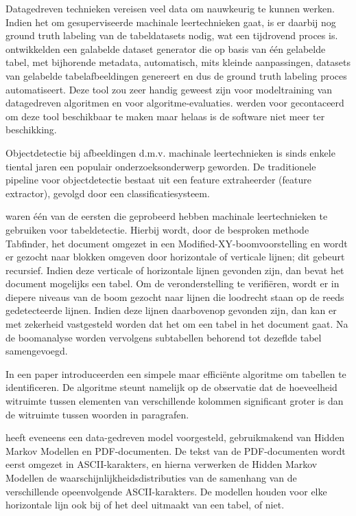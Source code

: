 Datagedreven technieken vereisen veel data om nauwkeurig te kunnen werken. Indien het om gesuperviseerde machinale leertechnieken gaat, is er daarbij nog ground truth labeling van de tabeldatasets nodig, wat een tijdrovend proces is. \textcite{Wangt2001} ontwikkelden een galabelde dataset generator die op basis van één gelabelde tabel, met bijhorende metadata, automatisch, mits kleinde aanpassingen, datasets van gelabelde tabelafbeeldingen genereert en dus de ground truth labeling proces automatiseert. Deze tool zou zeer handig geweest zijn voor modeltraining van datagedreven algoritmen en voor algoritme-evaluaties. \citeauthor{Wangt2001} werden voor gecontaceerd om deze tool beschikbaar te maken maar helaas is de software niet meer ter beschikking.

Objectdetectie bij afbeeldingen d.m.v. machinale leertechnieken is sinds enkele tiental jaren een populair onderzoeksonderwerp geworden. De traditionele pipeline voor objectdetectie bestaat uit een feature extraheerder (feature extractor), gevolgd door een classificatiesysteem.

\textcite{Cesarini2002} waren één van de eersten die geprobeerd hebben machinale leertechnieken te gebruiken voor tabeldetectie. Hierbij wordt, door de besproken methode Tabfinder, het document omgezet in een Modified-XY-boomvoorstelling en wordt er gezocht naar blokken omgeven door horizontale of verticale lijnen; dit gebeurt recursief. Indien deze verticale of horizontale lijnen gevonden zijn, dan bevat het document mogelijks een tabel. Om de veronderstelling te verifiëren, wordt er in diepere niveaus van de boom gezocht naar lijnen die loodrecht staan op de reeds gedetecteerde lijnen. Indien deze lijnen daarbovenop gevonden zijn, dan kan er met zekerheid vastgesteld worden dat het om een tabel in het document gaat. Na de boomanalyse worden vervolgens subtabellen behorend tot dezeflde tabel samengevoegd.

In een paper introduceerden \textcite{Mandal2006} een simpele maar efficiënte algoritme om tabellen te identificeren. De algoritme steunt namelijk op de observatie dat de hoeveelheid witruimte tussen elementen van verschillende kolommen significant groter is dan de witruimte tussen woorden in paragrafen.

\textcite{Silva2009} heeft eveneens een data-gedreven model voorgesteld, gebruikmakend van \Gls{Hidden Markov Model}len en PDF-documenten. De tekst van de PDF-documenten wordt eerst omgezet in ASCII-karakters, en hierna verwerken de \Gls{Hidden Markov Model}len de waarschijnlijkheidsdistributies van de samenhang van de verschillende opeenvolgende ASCII-karakters. De modellen houden voor elke horizontale lijn ook bij of het deel uitmaakt van een tabel, of niet.

